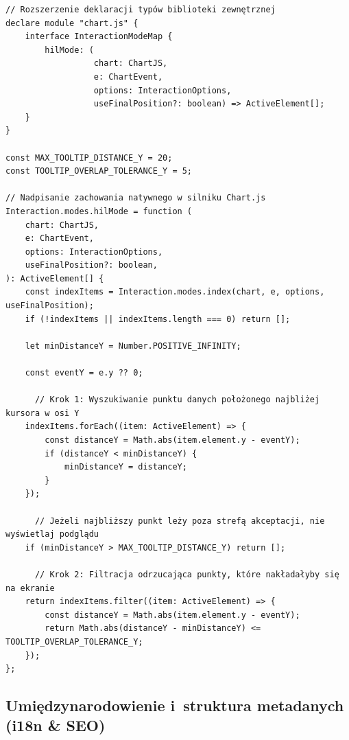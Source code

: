 \begin{listing}[htbp]
	\caption{Przeciążenie przestrzeni nazw Chart.js i~implementacja zaawansowanego algorytmu kolizyjnego dla Tooltipów (\texttt{DynamicLineChart.vue}) \cite{espy_nexus_nuxt_dashboard}.}
	\label{lst:chartjs_hilmode}
	\begin{verbatim}
// Rozszerzenie deklaracji typów biblioteki zewnętrznej
declare module "chart.js" {
	interface InteractionModeMap {
		hilMode: (
                  chart: ChartJS, 
                  e: ChartEvent, 
                  options: InteractionOptions, 
                  useFinalPosition?: boolean) => ActiveElement[];
	}
}

const MAX_TOOLTIP_DISTANCE_Y = 20;
const TOOLTIP_OVERLAP_TOLERANCE_Y = 5;

// Nadpisanie zachowania natywnego w silniku Chart.js
Interaction.modes.hilMode = function (
	chart: ChartJS,
	e: ChartEvent,
	options: InteractionOptions,
	useFinalPosition?: boolean,
): ActiveElement[] {
	const indexItems = Interaction.modes.index(chart, e, options, useFinalPosition);
	if (!indexItems || indexItems.length === 0) return [];

	let minDistanceY = Number.POSITIVE_INFINITY;

	const eventY = e.y ?? 0;

      // Krok 1: Wyszukiwanie punktu danych położonego najbliżej kursora w osi Y
	indexItems.forEach((item: ActiveElement) => {
		const distanceY = Math.abs(item.element.y - eventY);
		if (distanceY < minDistanceY) {
			minDistanceY = distanceY;
		}
	});

      // Jeżeli najbliższy punkt leży poza strefą akceptacji, nie wyświetlaj podglądu
	if (minDistanceY > MAX_TOOLTIP_DISTANCE_Y) return [];

      // Krok 2: Filtracja odrzucająca punkty, które nakładałyby się na ekranie
	return indexItems.filter((item: ActiveElement) => {
		const distanceY = Math.abs(item.element.y - eventY);
		return Math.abs(distanceY - minDistanceY) <= TOOLTIP_OVERLAP_TOLERANCE_Y;
	});
};
\end{verbatim}
\end{listing}

\subsection{Umiędzynarodowienie i~struktura metadanych (i18n \& SEO)}
\label{subsec:umiedzynarodowienie-i-struktura-metadanych}

